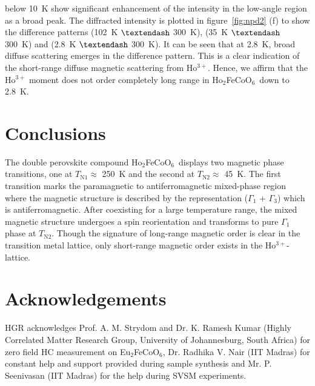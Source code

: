 \documentclass[12pt,twocolumns]{iopart}
\newcommand{\HFCO}{Ho$_2$FeCoO$_6$}
\newcommand{\EFCO}{Eu$_2$FeCoO$_6$}
\begin{document}
below 10~K show significant enhancement of the intensity in the
low-angle region as a broad peak. The diffracted intensity 
is plotted in figure~\ref{fig:npd2} (f) to show the difference patterns
(102~K $\textendash$ 300~K), (35~K $\textendash$ 300~K) and (2.8~K $\textendash$ 300~K). 
It can be seen that
at 2.8~K, broad diffuse scattering emerges in the
difference pattern. This is a clear indication of the
short-range diffuse magnetic scattering from Ho$^{3+}$.
Hence, we affirm that the Ho$^{3+}$ moment does not order
completely long range in \HFCO\ down to 2.8~K.
\section{Conclusions}
The double perovskite compound \HFCO\ displays two magnetic phase
transitions, one at $T_\mathrm{N1} \approx$ 250~K and the second
at $T_\mathrm{N2} \approx$ 45~K. The first transition marks the
paramagnetic to antiferromagnetic mixed-phase region where the
magnetic structure is described by the representation ($\Gamma_1$ + $\Gamma_3$)
which is antiferromagnetic. After coexisting for a large temperature range, 
the mixed magnetic structure undergoes a spin reorientation 
and transforms to pure $\Gamma_1$ phase at $T_\mathrm{N2}$.
Though the signature of long-range magnetic order is clear in the
transition metal lattice, only 
short-range magnetic order exists in the Ho$^{3+}$-lattice.
\section*{Acknowledgements}
HGR acknowledges Prof. A. M. Strydom and Dr. K. Ramesh Kumar (Highly Correlated Matter Research Group, University of Johannesburg, South Africa) for zero field HC measurement on \EFCO, Dr. Radhika V. Nair (IIT Madras) for constant help and support provided during sample synthesis and Mr. P. Seenivasan (IIT Madras) for the help during SVSM experiments. %
\newpage
\end{document}
